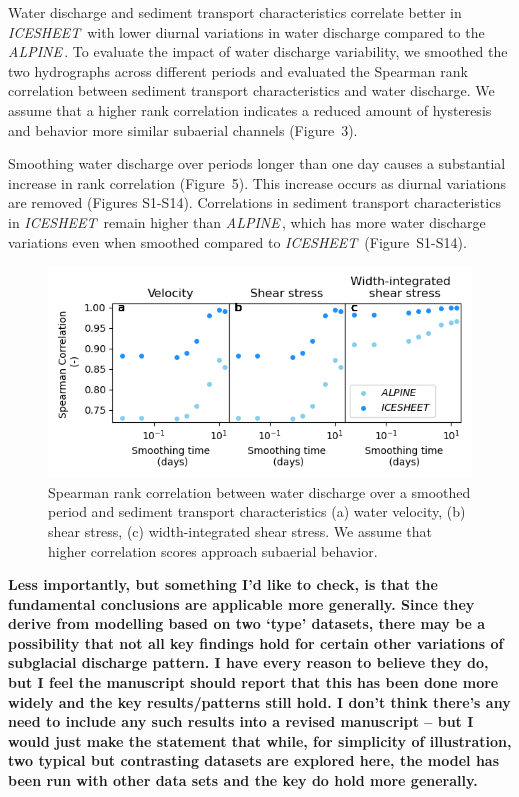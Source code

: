 \documentclass[11pt]{article}
\newcommand{\alpine}{\textit{ALPINE}\,}
\newcommand{\icesheet}{\textit{ICESHEET}\,}
\begin{document}
\begin{itemize}
{  
Water discharge and sediment transport characteristics correlate better in \icesheet{} with lower diurnal variations in water discharge compared to the \alpine{}.
To evaluate the impact of water discharge variability, we smoothed the two hydrographs across different periods and evaluated the Spearman rank correlation between sediment transport characteristics and water discharge.
We assume that a higher rank correlation indicates a reduced amount of hysteresis and behavior more similar subaerial channels (Figure~3).

Smoothing water discharge over periods longer than one day causes a substantial increase in rank correlation (Figure~5).
This increase occurs as diurnal variations are removed (Figures S1-S14).
Correlations in sediment transport characteristics in \icesheet{} remain higher than \alpine, which has more water discharge variations even when smoothed compared to \icesheet{} (Figure~S1-S14).  


\begin{figure}[hbt!]
  \centering
  \includegraphics[width=0.8\linewidth]{../Fig4.png}
  \caption{Spearman rank correlation between water discharge over a smoothed period and sediment transport characteristics (a) water velocity, (b) shear stress, (c) width-integrated shear stress. We assume that higher correlation scores approach subaerial behavior.
  }
  \label{fig:corri}
\end{figure}
  
\item \textbf{Less importantly, but something I’d like to check, is that the fundamental conclusions are
    applicable more generally. Since they derive from modelling based on two ‘type’ datasets, there
    may be a possibility that not all key findings hold for certain other variations of subglacial
    discharge pattern. I have every reason to believe they do, but I feel the manuscript should report
    that this has been done more widely and the key results/patterns still hold. I don’t think there’s
    any need to include any such results into a revised manuscript – but I would just make the
    statement that while, for simplicity of illustration, two typical but contrasting datasets are
    explored here, the model has been run with other data sets and the key do hold more generally.}

}
\end{itemize}
\end{document}
